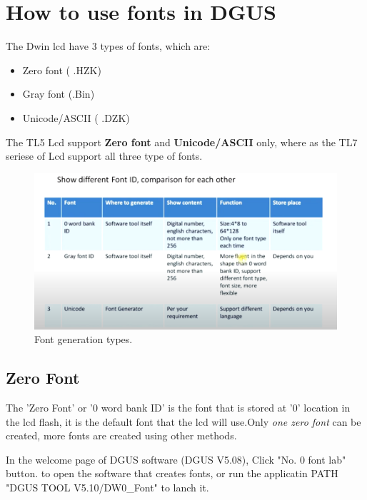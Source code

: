 \documentclass[12pt, A4]{article} %
\begin{document}
\section{How to use fonts in DGUS}
The Dwin lcd have 3 types of fonts, which are:
\begin{itemize}
\item Zero font ( .HZK)
\item Gray font (.Bin)
\item Unicode/ASCII ( .DZK)
\end{itemize}
The TL5 Lcd support \textbf{Zero font} and \textbf{Unicode/ASCII} only, where as the TL7 seriese of Lcd support all three type of fonts.
\begin{figure}[!htb] %
	\centering
	\includegraphics[width=12cm]{fontType} 
	\caption{Font generation types.\\}
\end{figure}
\subsection{Zero Font}
The 'Zero Font' or '0 word bank ID' is the font that is stored at '0' location in the lcd flash, it is the default font that the lcd will use.Only \emph{one zero font} can be created, more fonts are created using other methods.

In the welcome page of DGUS software (DGUS V5.08), Click "No. 0 font lab" button. to open the software that creates fonts, or run the applicatin PATH "DGUS TOOL V5.10/DW0\_Font" to lanch it.
\end{document}
